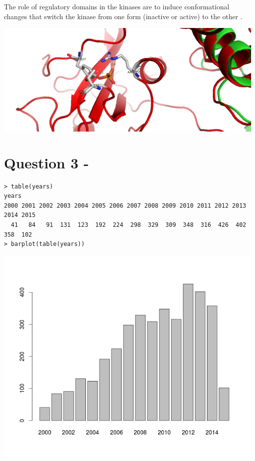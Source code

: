 \documentclass[11pt, a4paper,titlepage]{article}
\begin{document}
The role of regulatory domains in the kinases are to induce
conformational changes that switch the kinase from one form (inactive
or active) to the other \cite{ConformationalPlasticityKinases}.

\includegraphics[width=15cm]{./Figures/2b.png}

\section{Question 3 - }

\begin{verbatim}
> table(years)
years
2000 2001 2002 2003 2004 2005 2006 2007 2008 2009 2010 2011 2012 2013 2014 2015 
  41   84   91  131  123  192  224  298  329  309  348  316  426  402  358  102 
> barplot(table(years))
\end{verbatim}

\includegraphics[width=15cm]{./Figures/pdb_kinases_growth.png}


\end{document}
